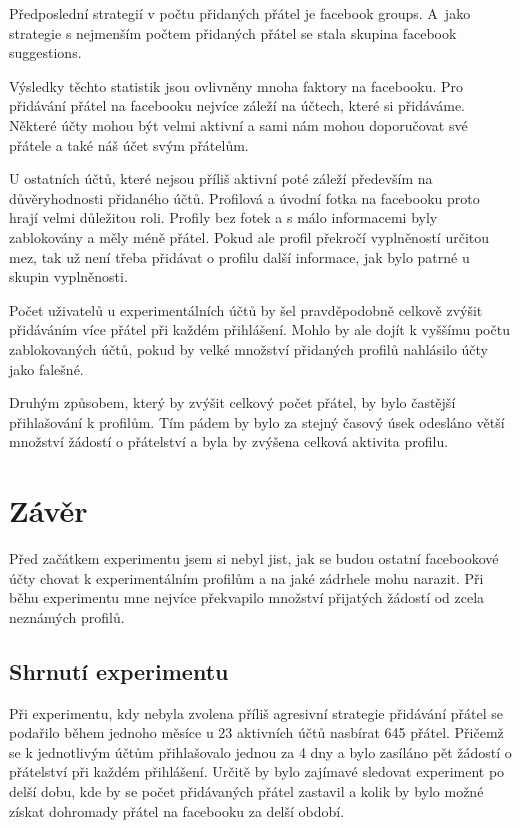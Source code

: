 \documentclass[thesis=M,czech]{FITthesis}[2013/05/10]
\begin{document}
Předposlední strategií v počtu přidaných přátel je facebook groups. A~jako strategie s nejmenším počtem přidaných přátel se stala skupina facebook suggestions. 

Výsledky těchto statistik jsou ovlivněny mnoha faktory na facebooku. Pro přidávání přátel na facebooku nejvíce záleží na účtech, které si přidáváme. Některé účty mohou být velmi aktivní a sami nám mohou doporučovat své přátele a také náš účet svým přátelům. 

U ostatních účtů, které nejsou příliš aktivní poté záleží především na důvěryhodnosti přidaného účtů. Profilová a úvodní fotka na facebooku proto hrají velmi důležitou roli. Profily bez fotek a s málo informacemi byly zablokovány a měly méně přátel. Pokud ale profil překročí vyplněností určitou mez, tak už není třeba přidávat o profilu další informace, jak bylo patrné u skupin vyplněnosti.

Počet uživatelů u experimentálních účtů by šel pravděpodobně celkově zvýšit přidáváním více přátel při každém přihlášení. Mohlo by ale dojít k vyššímu počtu zablokovaných účtů, pokud by velké množství přidaných profilů nahlásilo účty jako  falešné.

Druhým způsobem, který by zvýšit celkový počet přátel, by bylo častější přihlašování k profilům. Tím pádem by bylo za stejný časový úsek odesláno větší množství žádostí o přátelství a byla by zvýšena celková aktivita profilu.


\chapter{Z{\' a}v{\v e}r}

Před začátkem experimentu jsem si nebyl jist, jak se budou ostatní facebookové účty chovat k experimentálním profilům a na jaké zádrhele mohu narazit. Při běhu experimentu mne nejvíce překvapilo množství přijatých žádostí od zcela neznámých profilů.

\section{Shrnutí experimentu}

Při experimentu, kdy nebyla zvolena příliš agresivní strategie přidávání přátel se podařilo během jednoho měsíce u 23 aktivních účtů nasbírat 645 přátel. Přičemž se k jednotlivým účtům přihlašovalo jednou za 4 dny a bylo zasíláno pět žádostí o přátelství při každém přihlášení. Určitě by bylo zajímavé sledovat experiment po delší dobu, kde by se počet přidávaných přátel zastavil a kolik by bylo možné získat dohromady přátel na facebooku za delší období.
\end{document}

